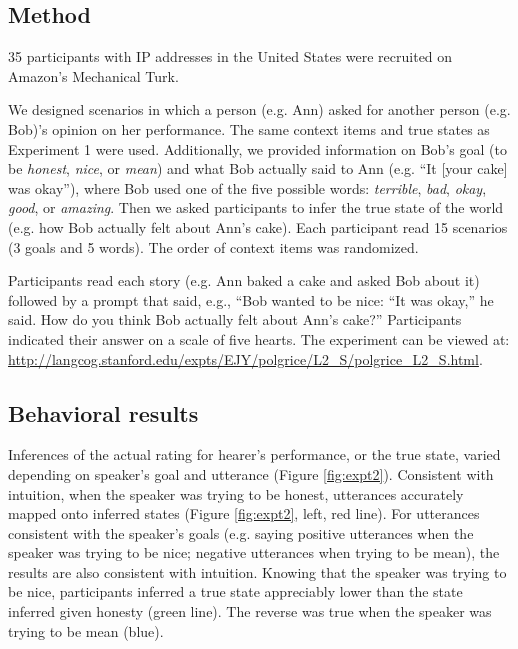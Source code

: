 \documentclass[10pt,letterpaper]{article}
\begin{document}
\subsection{Method}

35 participants with IP addresses in the United States were recruited on Amazon's Mechanical Turk.


We designed scenarios in which a person (e.g. Ann) asked for another person (e.g. Bob)'s opinion on her performance. The same context items and true states as Experiment 1 were used. Additionally, we provided information on Bob's goal (to be \emph{honest}, \emph{nice}, or \emph{mean}) and what Bob actually said to Ann (e.g. ``It [your cake] was okay''), where Bob used one of the five possible words: \emph{terrible}, \emph{bad}, \emph{okay}, \emph{good}, or \emph{amazing}. Then we asked participants to infer the true state of the world (e.g. how Bob actually felt about Ann's cake). Each participant read 15 scenarios (3 goals and 5 words). The order of context items was randomized.

Participants read each story (e.g. Ann baked a cake and asked Bob about it) followed by a prompt that said,
e.g., ``Bob wanted to be nice: ``It was okay,'' he said. How do you think Bob actually felt about Ann's cake?''
Participants indicated their answer on a scale of five hearts. 
The experiment can be viewed at: \url{http://langcog.stanford.edu/expts/EJY/polgrice/L2_S/polgrice_L2_S.html}.

\subsection{Behavioral results}

Inferences of the actual rating for hearer's performance, or the true state, varied depending on speaker's goal and utterance (Figure \ref{fig:expt2}).
Consistent with intuition, when the speaker was trying to be honest, utterances accurately mapped onto inferred states (Figure \ref{fig:expt2}, left, red line).
For utterances consistent with the speaker's goals (e.g. saying positive utterances when the speaker was trying to be nice; negative utterances when trying to be mean), the results are also consistent with intuition.
Knowing that the speaker was trying to be nice, participants inferred a true state appreciably lower than the state inferred given honesty (green line).
The reverse was true when the speaker was trying to be mean (blue).
\end{document}
